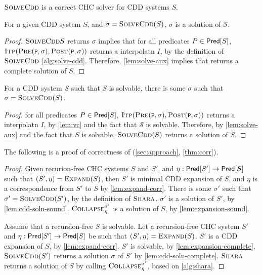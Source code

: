 $\textsc{SolveCdd}$ is a
correct CHC solver for CDD systems $S$.
%
\begin{lem}
  \label{lem:cdd-soln-sound}
  For a given CDD system $S$, and $\sigma = \textsc{SolveCdd}(S)$, %
  $\sigma$ is a solution of $\mathcal{S}$.
\end{lem}
%
\begin{proof}
  $\textsc{SolveCdd}{S}$ returns $\sigma$ implies that for all predicates 
  $P \in \mathsf{Pred}[ S ]$, $\solveitp(\prectr(\cc{P},\sigma),\postctr(\cc{P},\sigma))$ returns a interpolatn $I$, 
  by the definition of $\textsc{SolveCdd}$ \autoref{alg:solve-cdd}. 
  Therefore, \autoref{lem:solve-aux} implies that \solvecdd
  returns a complete solution of $S$.
\end{proof}

\begin{lem}
  \label{lem:cdd-soln-complete}
  For a CDD system $S$ such that $S$ is
  solvable, %
  there is some $\sigma$ such that %
  $\sigma = \textsc{SolveCdd}(S)$.
\end{lem}
%
\begin{proof}
  for all predicates $P \in \mathsf{Pred}[ S ]$, $\solveitp(\prectr(\cc{P},\sigma),\postctr(\cc{P},\sigma))$ returns a interpolatn $I$, by
  \autoref{lem:vc} and the fact that $\mathcal{S}$ is solvable.
  Therefore, by \autoref{lem:solve-aux} and the fact that
  $S$ is solvable, $\textsc{SolveCdd}(S)$ returns a
  solution of $S$.
\end{proof}

The following is a proof of correctness of \sys
(\autoref{sec:approach}, \autoref{thm:corr}).
%
\begin{proof}
  Given recurion-free CHC systems $S$ and $S'$, and $\eta :\mathsf{Pred}[ S' ] \to 
  \mathsf{Pred}[ S ]$ such that $(S', \eta) = \textsc{Expand}(S)$, 
  then $S'$ is minimal CDD expansion of 
  $S$, and $\eta$ is a correspondence from $S'$ to $S$ by \autoref{lem:expand-corr}.
  There is some $\sigma'$ such that
  $\sigma' = \textsc{SolveCdd}(S' )$, by
  the definition of $\textsc{Shara}$.
  $\sigma'$ is a solution of $S'$, by
  \autoref{lem:cdd-soln-sound}.
  $\textsc{Collapse}_{ \eta }^{ \sigma' }$ is a solution of $S$, by
  \autoref{lem:expansion-sound}.

  Assume that a recursion-free $S$ is solvable.
  Let a recursion-free CHC system $S'$ and $\eta :
  \mathsf{Pred}[ S' ] \to \mathsf{Pred}[ S ]$ be such that $(S',
  \eta) = \textsc{Expand}(S)$.
  $S'$ is a CDD expansion of $S$, by
  \autoref{lem:expand-corr}.
  $S'$ is solvable, by \autoref{lem:expansion-complete}.
  $\textsc{SolveCdd}(S')$ returns a solution $\sigma$ of $S'$ by \autoref{lem:cdd-soln-complete}.
  $\textsc{Shara}$ returns a solution of $S$ by calling $\textsc{Collapse}_{ \eta }^{ \sigma' }$, based on
  \autoref{alg:shara}.
\end{proof}

